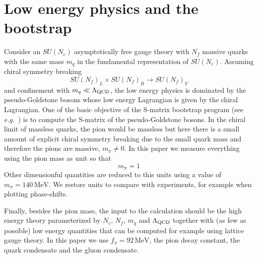 \documentclass[12pt,letterpaper]{article}
\newcommand{\eg}{{\it e.g.}}
\newcommand{\beq}{\begin{equation}}
\newcommand{\eeq}{\end{equation}}
\newcommand{\lqcd}{\ensuremath{\Lambda_{\mbox{\scriptsize QCD}}}}
\newcommand{\MeV}{\ensuremath{\mbox{MeV}}}
\begin{document}
\section{Low energy physics and the bootstrap}

 Consider an $SU(N_c)$ asymptotically free gauge theory with $N_f$ massive quarks with the same mass $m_q$ in the fundamental representation of $SU(N_c)$. Assuming chiral symmetry breaking 
 \begin{equation}\label{h1}
SU(N_f)_L\times SU(N_f)_R\to SU(N_f)_V
 \end{equation} 
 and confinement with $m_q\ll \lqcd$, the low energy physics is dominated by the pseudo-Goldstone bosons whose low energy Lagrangian is given by the chiral Lagrangian. One of the basic objective of the S-matrix bootstrap program (see \eg\ \cite{Kruczenski:2022lot}) is to compute the S-matrix of the pseudo-Goldstone bosons. In the chiral limit of massless quarks, the pion would be massless but here there is a small amount of explicit chiral symmetry breaking due to the small quark mass and therefore the pions are massive, $m_\pi\neq 0$. In this paper we measure everything using the pion mass as unit so that
 \beq\label{h2}
  m_\pi=1
 \eeq    
Other dimensionful quantities are reduced to this units using a value of $m_\pi=140\,\MeV$. We restore units to compare with experiments, for example when plotting phase-shifts. 

 Finally, besides the pion mass, the input to the calculation should be the high energy theory parameterized by $N_c$, $N_f$, $m_q$ and $\lqcd$ together with (as few as possible) low energy quantities that can be computed for example using lattice gauge theory. In this paper we use $f_\pi=92\,\MeV$, the pion decay constant, the quark condensate and the gluon condensate. 
 
 \medskip
 
\end{document}
